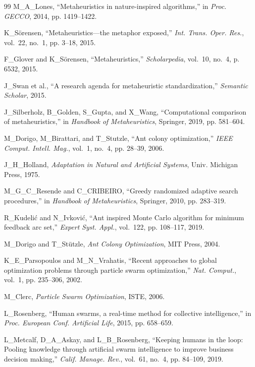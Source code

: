 \documentclass[letterpaper, 10pt, conference]{IEEEtran}
\begin{document}
\begin{thebibliography}{99}
M\_A\_Lones, ``Metaheuristics in nature-inspired algorithms,'' in \emph{Proc. GECCO}, 2014, pp. 1419--1422.

K\_Sörensen, ``Metaheuristics—the metaphor exposed,'' \emph{Int. Trans. Oper. Res.}, vol.~22, no.~1, pp. 3--18, 2015.

F\_Glover and K\_Sörensen, ``Metaheuristics,'' \emph{Scholarpedia}, vol.~10, no.~4, p. 6532, 2015.

J\_Swan et al., ``A research agenda for metaheuristic standardization,'' \emph{Semantic Scholar}, 2015.

J\_Silberholz, B\_Golden, S\_Gupta, and X\_Wang, ``Computational comparison of metaheuristics,'' in \emph{Handbook of Metaheuristics}, Springer, 2019, pp. 581--604.

M\_Dorigo, M\_Birattari, and T\_Stutzle, ``Ant colony optimization,'' \emph{IEEE Comput. Intell. Mag.}, vol.~1, no.~4, pp. 28--39, 2006.

J\_H\_Holland, \emph{Adaptation in Natural and Artificial Systems}, Univ. Michigan Press, 1975.

M\_G\_C\_Resende and C\_CRIBEIRO, ``Greedy randomized adaptive search procedures,'' in \emph{Handbook of Metaheuristics}, Springer, 2010, pp. 283--319.

R\_Kudelić and N\_Ivković, ``Ant inspired Monte Carlo algorithm for minimum feedback arc set,'' \emph{Expert Syst. Appl.}, vol.~122, pp. 108--117, 2019.

M\_Dorigo and T\_Stützle, \emph{Ant Colony Optimization}, MIT Press, 2004.

K\_E\_Parsopoulos and M\_N\_Vrahatis, ``Recent approaches to global optimization problems through particle swarm optimization,'' \emph{Nat. Comput.}, vol.~1, pp. 235--306, 2002.

M\_Clerc, \emph{Particle Swarm Optimization}, ISTE, 2006.

L\_Rosenberg, ``Human swarms, a real-time method for collective intelligence,'' in \emph{Proc. European Conf. Artificial Life}, 2015, pp. 658--659.

L\_Metcalf, D\_A\_Askay, and L\_B\_Rosenberg, ``Keeping humans in the loop: Pooling knowledge through artificial swarm intelligence to improve business decision making,'' \emph{Calif. Manage. Rev.}, vol.~61, no.~4, pp. 84--109, 2019.


\end{thebibliography}
\end{document}
